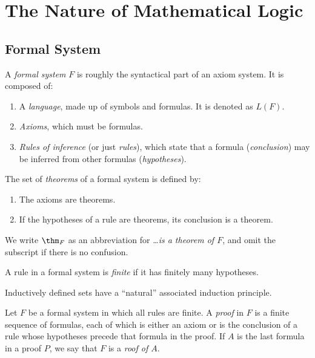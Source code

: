 \section{The Nature of Mathematical Logic}

\subsection{Formal System}

\begin{definition}
A \emph{formal system} $F$ is roughly the syntactical part of an axiom system. It is composed of:
\begin{enumerate}
    \item A \emph{language}, made up of symbols and formulas. It is denoted as $L(F)$.
    \item \emph{Axioms}, which must be formulas.
    \item \emph{Rules of inference} (or just \emph{rules}), which state that a formula (\emph{conclusion})
    may be inferred from other formulas (\emph{hypotheses}).
\end{enumerate}    
\end{definition}

\begin{definition}[Theorem]
    The set of \emph{theorems} of a formal system is defined by:
    \begin{enumerate}
        \item The axioms are theorems.
        \item If the hypotheses of a rule are theorems, its conclusion is a theorem.
    \end{enumerate}
    We write $\thm_F$ as an abbreviation for \emph{\dots is a theorem of $F$}, and omit 
    the subscript if there is no confusion.
\end{definition}

\begin{definition}
    A rule in a formal system is \emph{finite} if it has finitely many hypotheses.
\end{definition}

\begin{fact}
    Inductively defined sets have a ``natural'' associated induction principle.
\end{fact}

\begin{definition}[Proof]
    Let $F$ be a formal system in which all rules are finite. A \emph{proof} in $F$ is a finite sequence
    of formulas, each of which is either an axiom or is the conclusion of a rule whose hypotheses 
    precede that formula in the proof. If $A$ is the last formula in a proof $P$, we say that
    $F$ is a \emph{roof of $A$}. 
\end{definition}

